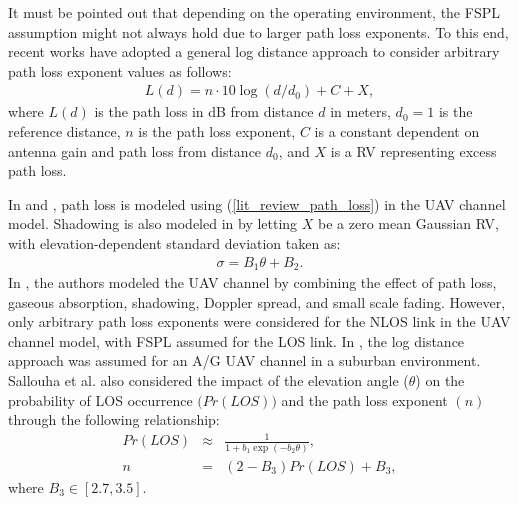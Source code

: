 It must be pointed out that depending on the operating environment, the FSPL assumption might not always hold due to larger path loss exponents. To this end, recent works have adopted a general log distance approach to consider arbitrary path loss exponent values as follows:
\begin{eqnarray} \label{lit_review_path_loss}
L(d)=n\cdot10\log\left({d}/{d_0}\right) + C + X,
\end{eqnarray}
where $L(d)$ is the path loss in dB from distance $d$ in meters, $d_0 = 1$ is the reference distance, $n$ is the path loss exponent, $C$ is a constant dependent on antenna gain and path loss from distance $d_0$, and $X$ is a RV representing excess path loss. 

In \cite{al2017modeling} and \cite{amorim2017radio}, path loss is modeled using (\ref{lit_review_path_loss}) in the UAV channel model. Shadowing is also modeled in \cite{al2017modeling} by letting $X$ be a zero mean Gaussian RV, with elevation-dependent standard deviation taken as:
\begin{eqnarray}
\sigma=B_1\theta + B_2.
\end{eqnarray}
In \cite{pokkunuru2017capacity}, the authors modeled the UAV channel by combining the effect of path loss, gaseous absorption, shadowing, Doppler spread, and small scale fading. However, only arbitrary path loss exponents were considered for the NLOS link in the UAV channel model, with FSPL assumed for the LOS link. In \cite{sallouha2017aerial}, the log distance approach was assumed for an A/G UAV channel in a suburban environment. Sallouha et al. \cite{sallouha2017aerial} also considered the impact of the elevation angle ($\theta$) on the probability of LOS occurrence $\big(Pr(LOS)\big)$ and the path loss exponent $(n)$ through the following relationship:
\begin{eqnarray}
Pr(LOS) & \approx & \frac{1}{1+b_1\exp\left(-b_2\theta\right)}, \\
n & = & (2-B_3)Pr(LOS) + B_3,
\end{eqnarray}
where $B_3 \in [2.7,3.5]$.

